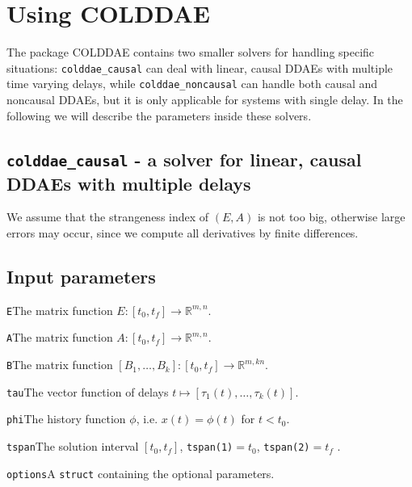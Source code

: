\documentclass[final,reqno]{siamltex}
\renewenvironment{itemize}[1]{\begin{compactitem}#1}{\end{compactitem}}
\begin{document}
\section{Using COLDDAE}

The package COLDDAE contains two smaller solvers for handling specific situations: {\tt colddae\_causal} can deal with linear, causal DDAEs with multiple time varying delays, 
while {\tt colddae\_noncausal} can handle both causal and noncausal DDAEs, but it is only applicable for systems with single delay. 
In the following we will describe the parameters inside these solvers.

\subsection{{\tt colddae\_causal} - a solver for linear, causal DDAEs with multiple delays}

We assume that the strangeness index of $(E,A)$ is not too big, otherwise large errors may occur, since we compute all derivatives by finite differences.

\subsection{Input parameters}
\begin{itemize}
\item {\tt E}\quad The matrix function $E:[t_0,t_f]\rightarrow \mathbb{R}^{m,n}$.
\item {\tt A}\quad The matrix function $A:[t_0,t_f]\rightarrow \mathbb{R}^{m,n}$.
\item {\tt B}\quad The matrix function $[B_1,\ldots,B_{k}]:[t_0,t_f]\rightarrow \mathbb{R}^{m,k n}$.
\item {\tt tau}\quad  The vector function of delays $t\mapsto[\tau_1(t),\ldots,\tau_{k}(t)]$.
\item {\tt phi}\quad The history function $\phi$, i.e. $x(t)=\phi(t)$ for $t < t_0$.
\item {\tt tspan}\quad The solution interval $[t_0,t_f]$, {\tt tspan(1)}$ = t_0$, {\tt tspan(2)}$ = t_f$ .
\item {\tt options}\quad A {\tt struct} containing the optional parameters.
\end{itemize}
\end{document}
